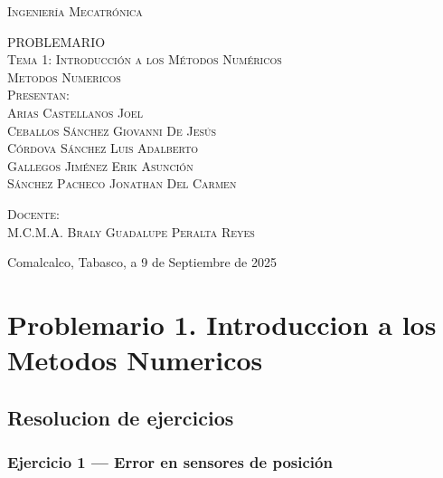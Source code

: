 \documentclass[12pt,a4paper]{report}
\begin{document}
\begin{titlepage}
\begin{minipage}[c][0.81\textheight][t]{0.75\textwidth}
\begin{center}
				{\large\scshape Ingeniería Mecatrónica}\\[.2in]
				
				\vspace{1.0cm}            
				
				\textsc{\Huge PROBLEMARIO}\\[0.5cm]
				\textsc{\large Tema 1: Introducción a los Métodos Numéricos}\\[0.5cm]
				\textsc{\large Metodos Numericos}\\[0.5cm]
				\textsc{\large Presentan:}\\[0.5cm]
				\textsc{\large {Arias Castellanos Joel\\Ceballos Sánchez Giovanni De Jesús\\Córdova Sánchez Luis Adalberto\\Gallegos Jiménez Erik Asunción \\Sánchez Pacheco Jonathan Del Carmen}}\\[2cm]          
				
				\vspace{0.4cm}
				
				{\large\scshape Docente:\\[0.3cm] {M.C.M.A. Braly Guadalupe Peralta Reyes }}\\[.2in]
				
				\vspace{0.4cm}
				
				\large{Comalcalco, Tabasco, a 9 de Septiembre de 2025}
			\end{center}
		\end{minipage}
	\end{titlepage}
	
	\tableofcontents
	\newpage
	
	\chapter{Problemario 1. Introduccion a los Metodos Numericos}
	\section*{Resolucion de ejercicios}
	
	\subsection*{Ejercicio 1 --- Error en sensores de posición}
	
\end{document}
